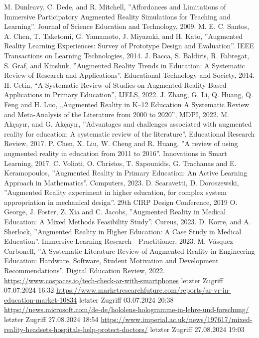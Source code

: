 \documentclass[conference]{IEEEtran}
\begin{document}
\begin{thebibliography}{00}
      M. Dunleavy, C. Dede, and R. Mitchell, ''Affordances and Limitations of Immersive Participatory Augmented Reality Simulations for Teaching and Learning''. Journal of Science Education and Technology, 2009.
     M. E. C. Santos, A. Chen, T. Taketomi, G. Yamamoto, J. Miyazaki, and H. Kato, ''Augmented Reality Learning Experiences: Survey of Prototype
    Design and Evaluation''. IEEE Transactions on Learning Technologies, 2014.
     J. Bacca, S. Baldiris, R. Fabregat, S. Graf, and Kinshuk, ''Augmented Reality Trends in Education: A Systematic Review of Research and Applications''. Educational Technology and Society, 2014.
     H. Cetin, “A Systematic Review of Studies on Augmented Reality Based Applications in Primary Education”, IJELS, 2022.
     J. Zhang, G. Li, Q. Huang, Q. Feng and H. Luo, „Augmented Reality in K–12 Education A Systematic Review and Meta-Analysis of the Literature from 2000 to 2020”, MDPI, 2022.
     M. Akçayır, and G. Akçayır, ''Advantages and challenges associated with augmented reality for education: A systematic review of the literature''. Educational Research Review, 2017.
     P. Chen, X. Liu, W. Cheng and R. Huang, ''A review of using augmented reality in education from 2011 to 2016''. Innovations in Smart Learning, 2017.
     C. Volioti, O. Christos, T. Sapounidis, G. Trachanas and E. Keramopoulos, ''Augmented Reality in Primary Education: An Active Learning Approach in Mathematics''. Computers, 2023.
     D. Scaravetti, D. Doroszewski, ''Augmented Reality experiment in higher education, for complex system appropriation in mechanical design''. 29th CIRP Design Conference, 2019
     O. George, J. Foster, Z. Xia and C. Jacobs, ''Augmented Reality in Medical Education: A Mixed Methods Feasibility Study''. Cureus, 2023.
     D. Korre, and A. Sherlock, ''Augmented Reality in Higher Education: A Case Study in Medical Education''. Immersive Learning Research - Practitioner, 2023.
     M. Vásquez-Carbonell, ''A Systematic Literature Review of Augmented Reality in Engineering Education: Hardware, Software, Student Motivation and Development Recommendations''. Digital Education Review, 2022.
 \href{https://www.cospaces.io/tech-check-ar-with-smartphones}{https://www.cospaces.io/tech-check-ar-with-smartphones} letzter Zugriff 07.07.2024 16:32
 \href{https://www.marketresearchfuture.com/reports/ar-vr-in-education-market-10834}{https://www.marketresearchfuture.com/reports/ar-vr-in-education-market-10834} letzter Zugriff 03.07.2024 20:38
 \href{https://news.microsoft.com/de-de/hololens-hologramme-in-lehre-und-forschung/}{https://news.microsoft.com/de-de/hololens-hologramme-in-lehre-und-forschung/} letzter Zugriff 27.08.2024 18:54
 \href{https://www.imperial.ac.uk/news/197617/mixed-reality-headsets-hospitals-help-protect-doctors/}{https://www.imperial.ac.uk/news/197617/mixed-reality-headsets-hospitals-help-protect-doctors/} letzter Zugriff 27.08.2024 19:03
\end{thebibliography}
\vspace{12pt}
\end{document}
